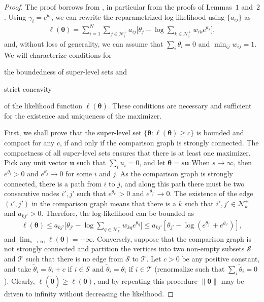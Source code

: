\begin{proof}
The proof borrows from \citet{hunter2004mm}, in particular from the proofs of Lemmas~$1$ and~$2$.
Using $\gamma_i = e^{\theta_i}$, we can rewrite the reparametrized log-likelihood using $\{ a_{ij} \}$ as
\begin{align*}
    \ell(\bm{\theta})
        = \sum_{i = 1}^N \sum_{j \in \mathcal{N}^+_i} a_{ij} \bigg[ \theta_j - \log \sum_{k \in \mathcal{N}^+_i} w_{ik} e^{\theta_k} \bigg],
\end{align*}
and, without loss of generality, we can assume that $\sum_i \theta_i = 0$ and $\min_{ij} w_{ij} = 1$.
We will characterize conditions for
\begin{enuminline}
\item the boundedness of super-level sets and
\item strict concavity
\end{enuminline}
of the likelihood function $\ell(\bm{\theta})$.
These conditions are necessary and sufficient for the existence and uniqueness of the maximizer.

First, we shall prove that the super-level set $\{ \bm{\theta} : \ell(\bm{\theta}) \ge c \}$ is bounded and compact for any $c$, if and only if the comparison graph is strongly connected.
The compactness of all super-level sets ensures that there is at least one maximizer.
Pick any unit vector $\bm{u}$ such that $\sum_i u_i = 0$, and let $\bm{\theta} = s \bm{u}$
When $s \to \infty$, then $e^{\theta_i} > 0$ and $e^{\theta_j} \to 0 $ for some $i$ and $j$.
As the comparison graph is strongly connected, there is a path from $i$ to $j$, and along this path there must be two consecutive nodes $i', j'$ such that $e^{\theta_{i'}} > 0$ and $e^{\theta_{j'}} \to 0$.
The existence of the edge $(i',j')$ in the comparison graph means that there is a $k$ such that $i', j' \in \mathcal{N}^+_k$ and $a_{kj'} > 0$.
Therefore, the log-likelihood can be bounded as
\begin{align*}
\ell(\bm{\theta})
    \le a_{kj'} \bigg[ \theta_{j'} - \log \sum_{q \in \mathcal{N}^+_k} w_{kq} e^{\theta_q} \bigg]
    \le a_{kj'} \left[ \theta_{j'} - \log (e^{\theta_{j'}} + e^{\theta_{i'}}) \right],
\end{align*}
and $\lim_{s \to \infty} \ell(\bm{\theta}) = -\infty$.
Conversely, suppose that the comparison graph is not strongly connected and partition the vertices into two non-empty subsets $\mathcal{S}$ and $\mathcal{T}$ such that there is no edge from $\mathcal{S}$ to $\mathcal{T}$.
Let $c > 0$ be any positive constant, and take $\tilde{\theta}_i = \theta_i + c$ if $i \in \mathcal{S}$ and $\tilde{\theta}_i = \theta_i$ if $i \in \mathcal{T}$ (renormalize such that $\sum_i \tilde{\theta}_i = 0$).
Clearly, $\ell(\tilde{\bm{\theta}}) \ge \ell(\bm{\theta})$, and by repeating this procedure $\lVert \bm{\theta} \rVert$ may be driven to infinity without decreasing the likelihood.


\end{proof}
